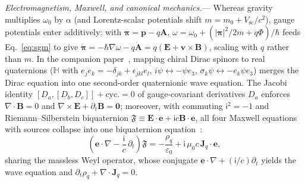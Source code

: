 \documentclass[aps,prl,reprint,superscriptaddress,nofootinbib,floatfix]{revtex4-2}
\theoremstyle{prlthm}
\newcommand{\prlsec}[1]{\par\smallskip\noindent\emph{#1.}---}
\begin{document}
\prlsec{Electromagnetism, Maxwell, and canonical mechanics}
Whereas gravity multiplies $\omega_0$ by $\alpha$ (and Lorentz-scalar potentials shift $m=m_0+V_\text{sc}/c^2$), gauge potentials enter additively: with $\boldsymbol{\pi}=\mathbf{p}-q\mathbf{A}$, $\omega=\omega_0+(|\boldsymbol{\pi}|^2/2m+q\Phi)/\hbar$ feeds Eq.~\eqref{eq:sgm} to give $\dot{\boldsymbol{\pi}}=-\hbar\nabla\omega-q\dot{\mathbf{A}}=q(\mathbf{E}+\mathbf{v}\times\mathbf{B})$, scaling with $q$ rather than $m$. In the companion paper~\citep{HutchisonWavefn2026}, mapping chiral Dirac spinors to real quaternions ($\mathbb{H}$ with $e_je_k=-\delta_{jk}+\epsilon_{jkl}e_l$, $i\psi\leftrightarrow-\psi e_3$, $\sigma_k\psi\leftrightarrow-e_k\psi e_3$) merges the Dirac equation into one second-order quaternionic wave equation. The Jacobi identity $[D_a,[D_b,D_c]]+\text{cyc.}=0$ of gauge-covariant derivatives $D_a$ enforces $\nabla\cdot\mathbf{B}=0$ and $\nabla\times\mathbf{E}+\partial_t\mathbf{B}=\mathbf{0}$; moreover, with commuting $\mathsf{i}^2=-1$ and Riemann--Silberstein biquaternion $\mathfrak{F}\equiv\mathbf{E}\cdot\mathbf{e}+\mathsf{i}c\mathbf{B}\cdot\mathbf{e}$, all four Maxwell equations with sources collapse into one biquaternion equation~\citep{Silberstein1912Quaternionic,BialynickiBirula1996Photon}:
\begin{equation}
  \left(\mathbf{e}\cdot\nabla-\frac{\mathsf{i}}{c}\,\partial_t\right)\mathfrak{F}=-\frac{\rho_q}{\varepsilon_0}+\mathsf{i}\,\mu_0 c\,\mathbf{J}_q\cdot\mathbf{e},
  \label{eq:maxwell_biquaternion}
\end{equation}
sharing the massless Weyl operator, whose conjugate $\mathbf{e}\cdot\nabla+(\mathsf{i}/c)\partial_t$ yields the wave equation and $\partial_t\rho_q+\nabla\cdot\mathbf{J}_q=0$.
\end{document}
